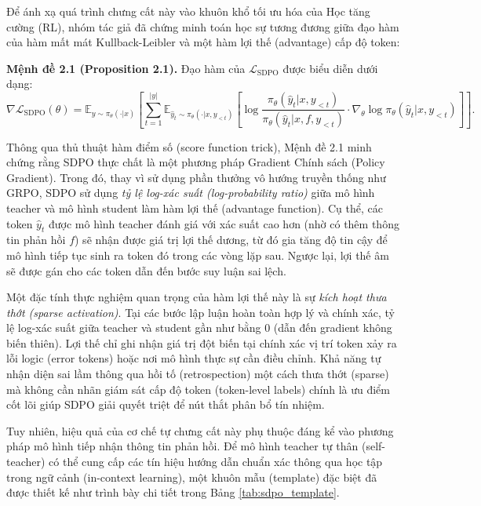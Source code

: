 \documentclass[12pt,a4paper]{report}
\begin{document}
Để ánh xạ quá trình chưng cất này vào khuôn khổ tối ưu hóa của Học tăng cường (RL), nhóm tác giả đã chứng minh toán học sự tương đương giữa đạo hàm của hàm mất mát Kullback-Leibler và một hàm lợi thế (advantage) cấp độ token:

\textbf{Mệnh đề 2.1 (Proposition 2.1).} Đạo hàm của $\mathcal{L}_{\text{SDPO}}$ được biểu diễn dưới dạng:
\begin{equation}
\nabla \mathcal{L}_{\text{SDPO}}(\theta) = \mathbb{E}_{y \sim \pi_\theta(\cdot|x)} \left[ \sum_{t=1}^{|y|} \mathbb{E}_{\hat{y}_t \sim \pi_\theta(\cdot|x,y_{<t})} \left[ \log \frac{\pi_\theta(\hat{y}_t | x, y_{<t})}{\pi_\theta(\hat{y}_t | x, f, y_{<t})} \cdot \nabla_\theta \log \pi_\theta(\hat{y}_t | x, y_{<t}) \right] \right].
\end{equation}

Thông qua thủ thuật hàm điểm số (score function trick), Mệnh đề 2.1 minh chứng rằng SDPO thực chất là một phương pháp Gradient Chính sách (Policy Gradient). Trong đó, thay vì sử dụng phần thưởng vô hướng truyền thống như GRPO, SDPO sử dụng \textit{tỷ lệ log-xác suất (log-probability ratio)} giữa mô hình teacher và mô hình student làm hàm lợi thế (advantage function). Cụ thể, các token $\hat{y}_t$ được mô hình teacher đánh giá với xác suất cao hơn (nhờ có thêm thông tin phản hồi $f$) sẽ nhận được giá trị lợi thế dương, từ đó gia tăng độ tin cậy để mô hình tiếp tục sinh ra token đó trong các vòng lặp sau. Ngược lại, lợi thế âm sẽ được gán cho các token dẫn đến bước suy luận sai lệch.

Một đặc tính thực nghiệm quan trọng của hàm lợi thế này là sự \textit{kích hoạt thưa thớt (sparse activation)}. Tại các bước lập luận hoàn toàn hợp lý và chính xác, tỷ lệ log-xác suất giữa teacher và student gần như bằng $0$ (dẫn đến gradient không biến thiên). Lợi thế chỉ ghi nhận giá trị đột biến tại chính xác vị trí token xảy ra lỗi logic (error tokens) hoặc nơi mô hình thực sự cần điều chỉnh. Khả năng tự nhận diện sai lầm thông qua hồi tố (retrospection) một cách thưa thớt (sparse) mà không cần nhãn giám sát cấp độ token (token-level labels) chính là ưu điểm cốt lõi giúp SDPO giải quyết triệt để nút thắt phân bổ tín nhiệm.

Tuy nhiên, hiệu quả của cơ chế tự chưng cất này phụ thuộc đáng kể vào phương pháp mô hình tiếp nhận thông tin phản hồi. Để mô hình teacher tự thân (self-teacher) có thể cung cấp các tín hiệu hướng dẫn chuẩn xác thông qua học tập trong ngữ cảnh (in-context learning), một khuôn mẫu (template) đặc biệt đã được thiết kế như trình bày chi tiết trong Bảng \ref{tab:sdpo_template}.
\end{document}
